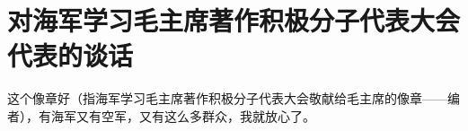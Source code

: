 \section[对海军学习毛主席著作积极分子代表大会代表的谈话（一九六七年十一月十九日）]{对海军学习毛主席著作积极分子代表大会代表的谈话}


这个像章好（指海军学习毛主席著作积极分子代表大会敬献给毛主席的像章——编者），有海军又有空军，又有这么多群众，我就放心了。

